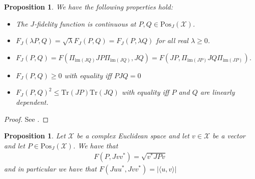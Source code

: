 \documentclass{amsart}
\numberwithin{equation}{section}
\newtheorem{proposition}[theorem]{Proposition}
\theoremstyle{definition}
\theoremstyle{plain}
\theoremstyle{solutionstyle}
\begin{document}
\begin{proposition}\label{properties of J fidelity}
   We have the following properties hold:
    \begin{itemize}
    
        \item The $J$-fidelity function is continuous at $P,Q \in \mathrm{Pos}_J(\mathcal{X})$.
        \item $F_J(\lambda P,Q)=\sqrt{\lambda}F_J(P,Q)=F_J(P,\lambda Q)$ for all real $\lambda\geq 0$.
        \item $F_J(P,Q)=F(\Pi_{\mathrm{im}(JQ)}JP\Pi_{\mathrm{im}(JQ)},  JQ)=F(JP,\Pi_{\mathrm{im}(JP)}JQ\Pi_{\mathrm{im}(JP)})$.
        \item $F_J(P,Q)\geq 0$ with equality iff $PJQ=0$
        \item $F_J(P,Q)^2\leq \mathrm{Tr}(JP)\mathrm{Tr}(JQ)$ with equality iff $P$ and $Q$ are linearly dependent.
    \end{itemize}
\end{proposition}
\begin{proof}
    See \citep[p.~140]{Watrous_2018}.
\end{proof}


\begin{proposition}
    Let $\mathcal{X}$ be a complex Euclidean space and let $v\in \mathcal{X}$ be a vector and let $P\in \mathrm{Pos}_J(\mathcal{X})$. We have that 
    \begin{align*}
        F(P, Jvv^*)=\sqrt{v^*JPv}
    \end{align*}
    and in particular we have that $F(Juu^*, Jvv^*)=|\langle u,v\rangle |$
\end{proposition}
\end{document}

